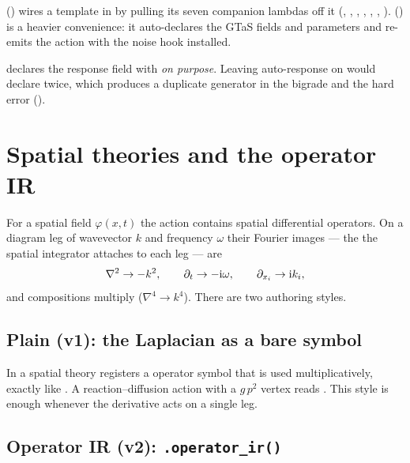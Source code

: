  () wires a template in by
pulling its seven companion lambdas off it (, ,
, , ,
, ). 
() is a heavier convenience: it auto-declares the
GTaS fields and parameters and re-emits the action with the noise hook installed.

\begin{gotcha}
 declares the response field  with
 \emph{on purpose}. Leaving auto-response on would
declare  twice, which produces a duplicate  generator in the
bigrade  and the hard error  ().
\end{gotcha}

\section{Spatial theories and the operator IR}

For a spatial field $\varphi(x,t)$ the action contains spatial differential
operators. On a diagram leg of wavevector $k$ and frequency $\omega$ their Fourier
images --- the  the spatial integrator attaches to each leg ---
are
\[
  \nabla^2 \to -k^{2}, \qquad \partial_t \to -\mathrm{i}\omega, \qquad \partial_{x_i} \to \mathrm{i} k_i,
\]
and compositions multiply ($\nabla^{4}\to k^{4}$). There are two authoring styles.

\subsection{Plain (v1): the Laplacian as a bare symbol}

In a spatial theory  registers a  operator symbol
that is used multiplicatively, exactly like . A reaction--diffusion
action with a $g\,p^{2}$ vertex reads
. This style is enough
whenever the derivative acts on a single leg.

\subsection{Operator IR (v2): \texttt{.operator\_ir()}}

